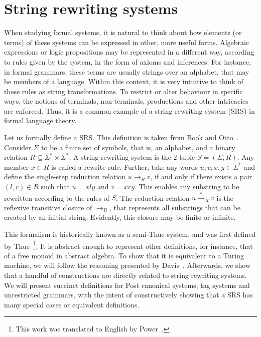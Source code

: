 \documentclass[12pt]{article}
\begin{document}
\section{String rewriting systems}\label{sec:srs}

When studying formal systems, it is natural to think about how elements (or terms) of these systems can be expressed in other, more useful forms. Algebraic expressions or logic propositions may be represented in a different way, according to rules given by the system, in the form of axioms and inferences. For instance, in formal grammars, these terms are usually strings over an alphabet, that may be members of a language. Within this context, it is very intuitive to think of these rules as string transformations. To restrict or alter behaviour in specific ways, the notions of terminals, non-terminals, productions and other intricacies are enforced. Thus, it is a common example of a string rewriting system (SRS) in formal language theory.

Let us formally define a SRS. This definition is taken from Book and Otto~\cite{}. Consider $\Sigma$ to be a finite set of symbols, that is, an alphabet, and a binary relation $R \subseteq \Sigma^{*} \times \Sigma^{*}$. A string rewriting system is the $2$-tuple $S = (\Sigma, R)$. Any member $x \in R$ is called a rewrite rule. Further, take any words $u, v, x, y \in \Sigma^{*}$ and define the single-step reduction relation $u \rightarrow_{R} v$, if and only if there exists a pair $(l, r) \in R$ such that $u = xly$ and $v = xry$. This enables any substring to be rewritten according to the rules of $S$. The reduction relation $u \stackrel{*}{\rightarrow}_{R} v$ is the reflexive transitive closure of $\rightarrow_{R}$, that represents all substrings that can be created by an initial string. Evidently, this closure may be finite or infinite.

This formalism is historically known as a semi-Thue system, and was first defined by Thue~\cite{}\footnote{This work was translated to English by Power~\cite{}.}. It is abstract enough to represent other definitions, for instance, that of a free monoid in abstract algebra. To show that it is equivalent to a Turing machine, we will follow the reasoning presented by Davis~\cite{}. Afterwards, we show that a handful of constructions are directly related to string rewriting systems. We will present succinct definitions for Post canonical systems, tag systems and unrestricted grammars, with the intent of constructively showing that a SRS has many special cases or equivalent definitions.
\end{document}
